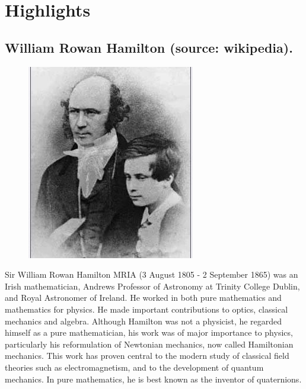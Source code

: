 \documentclass[english,graybox,envcountchap,envcountsame,sectrefs,shortlabels]{svmono}
\theoremstyle{style}
\begin{document}
\newpage
\section*{Highlights}

\begin{subappendices}

\section{William Rowan Hamilton (source: wikipedia).}

\begin{figure} \centering

\includegraphics[scale=0.45]{hamilton}

\end{figure}

Sir William Rowan Hamilton MRIA (3 August 1805 - 2 September 1865) was an Irish mathematician, Andrews Professor of Astronomy at Trinity College Dublin, and Royal Astronomer of Ireland. He worked in both pure mathematics and mathematics for physics. He made important contributions to optics, classical mechanics and algebra. Although Hamilton was not a physicist, he regarded himself as a pure mathematician, his work was of major importance to physics, particularly his reformulation of Newtonian mechanics, now called Hamiltonian mechanics. This work has proven central to the modern study of classical field theories such as electromagnetism, and to the development of quantum mechanics. In pure mathematics, he is best known as the inventor of quaternions.



\end{subappendices}
\end{document}
